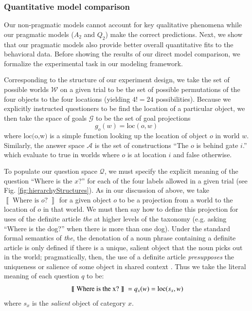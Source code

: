 \documentclass[12pt, floatsintext, jou]{apa6}
\newcommand{\den}[2][]{
\(
\left\llbracket\;\text{#2}\;\right\rrbracket^{#1}
\)
}
\begin{document}

\subsubsection{Quantitative model comparison}

Our non-pragmatic models cannot account for key qualitative phenomena while our pragmatic models ($A_2$ and $Q_2$) make the correct predictions. Next, we show that our pragmatic models also provide better overall quantitative fits to the behavioral data. Before showing the results of our direct model comparison, we formalize the experimental task in our modeling framework. 

Corresponding to the structure of our experiment design, we take the set of possible worlds $\mathcal{W}$ on a given trial to be the set of possible permutations of the four objects to the four locations (yielding $4! = 24$ possibilities). Because we explicitly instructed questioners to be find the location of a particular object, we then take the space of goals $\mathcal{G}$ to be the set of goal projections $$g_o(w) = \textrm{loc}(o,w)$$ where $\textrm{loc(o,w)}$ is a simple function looking up the location of object $o$ in world $w$. Similarly, the answer space $\mathcal{A}$ is the set of constructions ``The $o$ is behind gate $i$.'' which evaluate to true in worlds where $o$ is at location $i$ and false otherwise.

To populate our question space $\mathcal{Q}$, we must specify the explicit meaning of the question ``Where is the $x$?'' for each of the four labels allowed in a given trial (see Fig. \ref{fig:hierarchyStructures}). As in our discussion of  above, we take \textrm{\den{Where is $o$?}} for a given object $o$ to be a projection from a world to the location of $o$ in that world. We must then say how to define this projection for uses of the definite article \emph{the} at higher levels of the taxonomy (e.g. asking ``Where is the dog?'' when there is more than one dog). Under the standard formal semantics of \emph{the}, the denotation of a noun phrase containing a definite article is only defined if there is a unique, salient object that the noun picks out in the world; pragmatically, then, the use of a definite article \emph{presupposes} the uniqueness or salience of some object in shared context \cite{Lewis79_Scorekeeping, clark1983common, Roberts03_UniquenessDefiniteNounPhrases}. Thus we take the literal meaning of each question $q$ to be: 
$$\textrm{\den{Where is the x?}} = q_{x}(w) = \textrm{loc}(s_x,w)$$ where $s_x$ is the \emph{salient} object of category $x$. 
\end{document}
